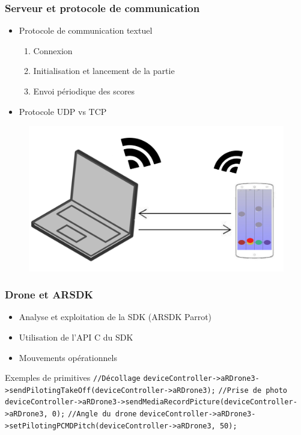 \begin{frame}
\frametitle{Serveur et protocole de communication}
\begin{center}
\begin{itemize}
\item Protocole de communication textuel
\begin{enumerate}
\item Connexion 
\item Initialisation et lancement de la partie
\item Envoi périodique des scores
\end{enumerate}
\item Protocole UDP vs TCP
\end{itemize}
\begin{figure}
\includegraphics[scale=0.05]{images/client_serveur.jpg}
\end{figure}
\end{center}
\end{frame}

\begin{frame}
\frametitle{Drone et ARSDK}
\begin{center}
\begin{itemize}
\item Analyse et exploitation de la SDK (ARSDK Parrot)
\item Utilisation de l'API C du SDK
\item Mouvements opérationnels
\end{itemize}
\begin{exampleblock}{Exemples de primitives}
{\tiny
\verb!//Décollage! \newline
\verb!deviceController->aRDrone3->sendPilotingTakeOff(deviceController->aRDrone3);! \newline
\verb!//Prise de photo! \newline
\verb!deviceController->aRDrone3->sendMediaRecordPicture(deviceController->aRDrone3, 0);! \newline
\verb!//Angle du drone! \newline
\verb!deviceController->aRDrone3->setPilotingPCMDPitch(deviceController->aRDrone3, 50);!}
\end{exampleblock}
\end{center}
\end{frame}

